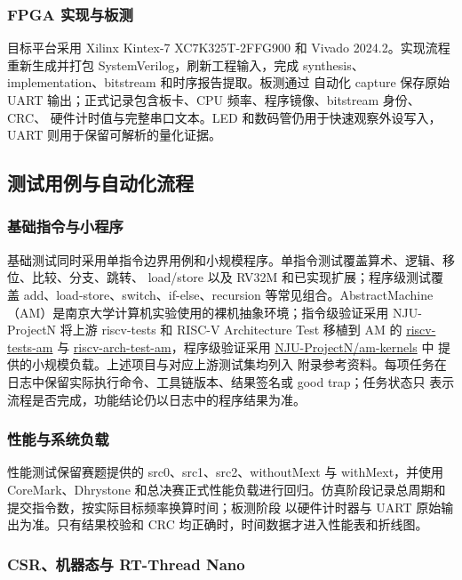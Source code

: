 \subsubsection{FPGA 实现与板测}

目标平台采用 Xilinx Kintex-7 XC7K325T-2FFG900 和 Vivado 2024.2。实现流程重新生成并打包
SystemVerilog，刷新工程输入，完成 synthesis、implementation、bitstream 和时序报告提取。板测通过
自动化 capture 保存原始 UART 输出；正式记录包含板卡、CPU 频率、程序镜像、bitstream 身份、CRC、
硬件计时值与完整串口文本。LED 和数码管仍用于快速观察外设写入，UART 则用于保留可解析的量化证据。

\subsection{测试用例与自动化流程}

\subsubsection{基础指令与小程序}

基础测试同时采用单指令边界用例和小规模程序。单指令测试覆盖算术、逻辑、移位、比较、分支、跳转、
load/store 以及 RV32M 和已实现扩展；程序级测试覆盖 add、load-store、switch、if-else、recursion
等常见组合。AbstractMachine（AM）是南京大学计算机实验使用的裸机抽象环境；指令级验证采用
NJU-ProjectN 将上游 riscv-tests 和 RISC-V Architecture Test 移植到 AM 的
\href{https://github.com/NJU-ProjectN/riscv-tests-am}{riscv-tests-am} 与
\href{https://github.com/NJU-ProjectN/riscv-arch-test-am}{riscv-arch-test-am}，程序级验证采用
\href{https://github.com/NJU-ProjectN/am-kernels}{NJU-ProjectN/am-kernels} 中
 提供的小规模负载。上述项目与对应上游测试集均列入
附录参考资料。每项任务在日志中保留实际执行命令、工具链版本、结果签名或 good trap；任务状态只
表示流程是否完成，功能结论仍以日志中的程序结果为准。

\subsubsection{性能与系统负载}

性能测试保留赛题提供的 src0、src1、src2、withoutMext 与 withMext，并使用 CoreMark、Dhrystone
和总决赛正式性能负载进行回归。仿真阶段记录总周期和提交指令数，按实际目标频率换算时间；板测阶段
以硬件计时器与 UART 原始输出为准。只有结果校验和 CRC 均正确时，时间数据才进入性能表和折线图。

\subsubsection{CSR、机器态与 RT-Thread Nano}

